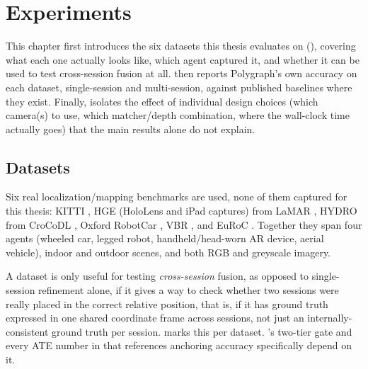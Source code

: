 %
\chapter{Experiments}
\label{chap:experiments}

This chapter first introduces the six datasets this thesis evaluates on
(), covering what each one actually looks like, which agent captured
it, and whether it can be used to test cross-session fusion at all. 
then reports Polygraph's own accuracy on each dataset, single-session and multi-session, against
published baselines where they exist. Finally,  isolates the
effect of individual design choices (which camera(s) to use, which matcher/depth combination,
where the wall-clock time actually goes) that the main results alone do not explain.

\section{Datasets}
\label{sec:experiments-datasets}

Six real localization/mapping benchmarks are used, none of them captured for this thesis: KITTI
\cite{geiger2012kitti}, HGE (HoloLens and iPad captures) from LaMAR \cite{sarlin2022lamar}, HYDRO
from CroCoDL \cite{blum2025crocodl}, Oxford RobotCar \cite{maddern2017robotcar,maddern2020rtk},
VBR \cite{vbr}, and EuRoC \cite{burri2016euroc}. Together they span four agents (wheeled car,
legged robot, handheld/head-worn AR device, aerial vehicle), indoor and outdoor scenes, and both
RGB and greyscale imagery.

A dataset is only useful for testing \emph{cross-session} fusion, as opposed to single-session
refinement alone, if it gives a way to check whether two sessions were really placed in the
correct relative position, that is, if it has ground truth expressed in one shared coordinate
frame across sessions, not just an internally-consistent ground truth per session. 
marks this per dataset. 's two-tier gate and every ATE number in
 that references anchoring accuracy specifically depend on it.

